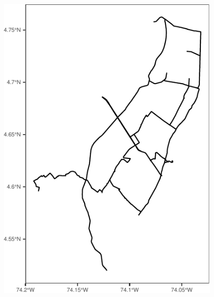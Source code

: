 \documentclass[
  shownotes,
  xcolor={svgnames},
  hyperref={colorlinks,citecolor=DarkBlue,linkcolor=DarkRed,urlcolor=DarkBlue}
   , aspectratio=169]{beamer}
\begin{document}
\begin{frame}[fragile]
\begin{minipage}[t]{0.43\linewidth}
\begin{figure}[H]
            \includegraphics[scale=0.6]{figures/unnamed-chunk-2-1.pdf}
 \end{figure}
    \end{minipage}

\end{frame}
\end{document}
